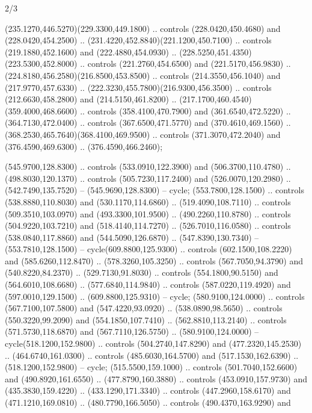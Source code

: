 \begin{flagdescription}{2/3}
\begin{scope}[xshift=0.5\flaglength,yshift=0.5\flagwidth,scale=\flagwidth/255]
\begin{scope}[y=-0.43pt, x=0.43pt,xshift=-193pt,yshift=133pt]
\begin{scope}[draw=black,line width=0.003\flagwidth]
  (235.1270,446.5270)(229.3300,449.1800) .. controls (228.0420,450.4680) and
  (228.0420,454.2500) .. (231.4220,452.8840)(221.1200,450.7100) .. controls
  (219.1880,452.1600) and (222.4880,454.0930) ..
  (228.5250,451.4350)(223.5300,452.8000) .. controls (221.2760,454.6500) and
  (221.5170,456.9830) .. (224.8180,456.2580)(216.8500,453.8500) .. controls
  (214.3550,456.1040) and (217.9770,457.6330) ..
  (222.3230,455.7800)(216.9300,456.3500) .. controls (212.6630,458.2800) and
  (214.5150,461.8200) .. (217.1700,460.4540)(359.4000,468.6600) .. controls
  (358.4100,470.7900) and (361.6540,472.5220) .. (364.7130,472.0400) .. controls
  (367.6500,471.5770) and (370.4610,469.1560) ..
  (368.2530,465.7640)(368.4100,469.9500) .. controls (371.3070,472.2040) and
  (376.4590,469.6300) .. (376.4590,466.2460);
\begin{scope}[fill=white]
 (545.9700,128.8300) .. controls (533.0910,122.3900) and
  (506.3700,110.4780) .. (498.8030,120.1370) .. controls (505.7230,117.2400) and
  (526.0070,120.2980) .. (542.7490,135.7520) -- (545.9690,128.8300) -- cycle;
 (553.7800,128.1500) .. controls (538.8880,110.8030) and
  (530.1170,114.6860) .. (519.4090,108.7110) .. controls (509.3510,103.0970) and
  (493.3300,101.9500) .. (490.2260,110.8780) .. controls (504.9220,103.7210) and
  (518.4140,114.7270) .. (526.7010,116.0580) .. controls (538.0840,117.8860) and
  (544.5090,126.6870) .. (547.8390,130.7340) -- (553.7810,128.1500) --
  cycle(609.8800,125.9300) .. controls (602.1500,108.2220) and
  (585.6260,112.8470) .. (578.3260,105.3250) .. controls (567.7050,94.3790) and
  (540.8220,84.2370) .. (529.7130,91.8030) .. controls (554.1800,90.5150) and
  (564.6010,108.6680) .. (577.6840,114.9840) .. controls (587.0220,119.4920) and
  (597.0010,129.1500) .. (609.8800,125.9310) -- cycle;
 (580.9100,124.0000) .. controls (567.7100,107.5800) and
  (547.4220,93.0920) .. (538.0890,98.5650) .. controls (550.3220,99.2090) and
  (554.1850,107.7410) .. (562.8810,113.2140) .. controls (571.5730,118.6870) and
  (567.7110,126.5750) .. (580.9100,124.0000) -- cycle(518.1200,152.9800) ..
  controls (504.2740,147.8290) and (477.2320,145.2530) .. (464.6740,161.0300) ..
  controls (485.6030,164.5700) and (517.1530,162.6390) .. (518.1200,152.9800) --
  cycle;
 (515.5500,159.1000) .. controls (501.7040,152.6600) and
  (490.8920,161.6550) .. (477.8790,160.3880) .. controls (453.0910,157.9730) and
  (435.3830,159.4220) .. (433.1290,171.3340) .. controls (447.2960,158.6170) and
  (471.1210,169.0810) .. (480.7790,166.5050) .. controls (490.4370,163.9290) and

\end{scope}
\end{scope}
\end{scope}
\end{scope}
\end{flagdescription}
